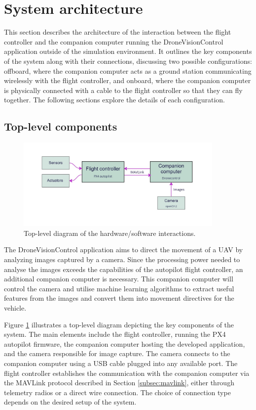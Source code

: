 \section{System architecture}
\label{sec:sysarch}

This section describes the architecture of the interaction between the flight controller and the companion computer running the DroneVisionControl application outside of the simulation environment. It outlines the key components of the system along with their connections, discussing two possible configurations: offboard, where the companion computer acts as a ground station communicating wirelessly with the flight controller, and onboard, where the companion computer is physically connected with a cable to the flight controller so that they can fly together. The following sections explore the details of each configuration.

\subsection{Top-level components}

\begin{figure}
  \centering
  \includegraphics[width=0.9\textwidth,keepaspectratio]{img/sys-arch-diagram.jpg}
  \caption{Top-level diagram of the hardware/software interactions.}
  \label{fig:toplevel}
\end{figure}

The DroneVisionControl application aims to direct the movement of a UAV by analyzing images captured by a camera. Since the processing power needed to analyse the images exceeds the capabilities of the autopilot flight controller, an additional companion computer is necessary. This companion computer will control the camera and utilise machine learning algorithms to extract useful features from the images and convert them into movement directives for the vehicle.

Figure \ref{fig:toplevel} illustrates a top-level diagram depicting the key components of the system. The main elements include the flight controller, running the PX4 autopilot firmware, the companion computer hosting the developed application, and the camera responsible for image capture.  The camera connects to the companion computer using a USB cable plugged into any available port. The flight controller establishes the communication with the companion computer via the MAVLink protocol described in Section \ref{subsec:mavlink}, either through telemetry radios or a direct wire connection. The choice of connection type depends on the desired setup of the system.

